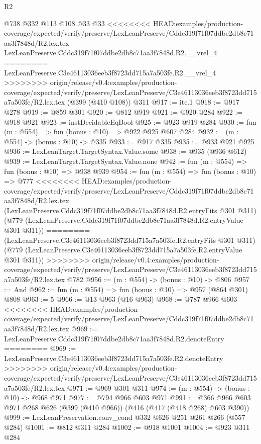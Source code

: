 \begin{lexlean}{R2}
\begin{coremodule}
{{{{{{{{{{{{{{{{{{{{{{    @738
    @332
    @113
    @108
    @33
    @33
<<<<<<<< HEAD:examples/production-coverage/expected/verify/preserve/LexLeanPreserve/Cddc319f71f07ddbe2db8c71aa3f7848d/R2.lex.tex
    LexLeanPreserve.Cddc319f71f07ddbe2db8c71aa3f7848d.R2.__vrel_4
========
    LexLeanPreserve.C3e46113036eeb3f8723dd715a7a503fe.R2.__vrel_4
>>>>>>>> origin/release/v0.4:examples/production-coverage/expected/verify/preserve/LexLeanPreserve/C3e46113036eeb3f8723dd715a7a503fe/R2.lex.tex
    (@399 (@410 @108))
    @311
@917 := ite.{1}
@918 := @917 @278
@919 := @859 @301
@920 := @812 @919
@921 := @920 @284
@922 := @918 @921
@923 := instDecidableEqBool
@925 := @923 @919 @284
@930 := fun (m : @554) => fun (bonus : @10) => @922 @925 @607 @284
@932 := (m : @554) -> (bonus : @10) -> @335
@933 := @917 @335
@935 := @933 @921 @925
@936 := LexLeanTarget.TargetSyntax.Value.some
@938 := @935 (@936 @612)
@939 := LexLeanTarget.TargetSyntax.Value.none
@942 := fun (m : @554) => fun (bonus : @10) => @938 @939
@954 := fun (m : @554) =>
  fun (bonus : @10) =>
  @777
<<<<<<<< HEAD:examples/production-coverage/expected/verify/preserve/LexLeanPreserve/Cddc319f71f07ddbe2db8c71aa3f7848d/R2.lex.tex
    (LexLeanPreserve.Cddc319f71f07ddbe2db8c71aa3f7848d.R2.entryFits @301 @311)
    (@779 (LexLeanPreserve.Cddc319f71f07ddbe2db8c71aa3f7848d.R2.entryValue @301 @311))
========
    (LexLeanPreserve.C3e46113036eeb3f8723dd715a7a503fe.R2.entryFits @301 @311)
    (@779 (LexLeanPreserve.C3e46113036eeb3f8723dd715a7a503fe.R2.entryValue @301 @311))
>>>>>>>> origin/release/v0.4:examples/production-coverage/expected/verify/preserve/LexLeanPreserve/C3e46113036eeb3f8723dd715a7a503fe/R2.lex.tex
    @782
@956 := (m : @554) -> (bonus : @10) -> @806
@957 := And
@962 := fun (m : @554) => fun (bonus : @10) => @957 (@864 @301) @808
@963 := 5
@966 := @13 @963 (@16 @963)
@968 := @787 @966 @603
<<<<<<<< HEAD:examples/production-coverage/expected/verify/preserve/LexLeanPreserve/Cddc319f71f07ddbe2db8c71aa3f7848d/R2.lex.tex
@969 := LexLeanPreserve.Cddc319f71f07ddbe2db8c71aa3f7848d.R2.denoteEntry
========
@969 := LexLeanPreserve.C3e46113036eeb3f8723dd715a7a503fe.R2.denoteEntry
>>>>>>>> origin/release/v0.4:examples/production-coverage/expected/verify/preserve/LexLeanPreserve/C3e46113036eeb3f8723dd715a7a503fe/R2.lex.tex
@971 := @969 @301 @311
@974 := (m : @554) -> (bonus : @10) -> @968 @971
@977 := @794 @966 @603 @971
@991 := @366 @966 @603 @971 @268 @626 (@399 (@410 @966)) (@416 (@417 (@418 @268) @603 @390))
@999 := LexLeanPreservation.conv_cond @332 @626 @251 @261 @266 (@557 @284)
@1001 := @812 @311 @284
@1002 := @918 @1001
@1004 := @923 @311 @284
}}}}}}}}}}}}}}}}}}}}}}
\end{coremodule}
\end{lexlean}
